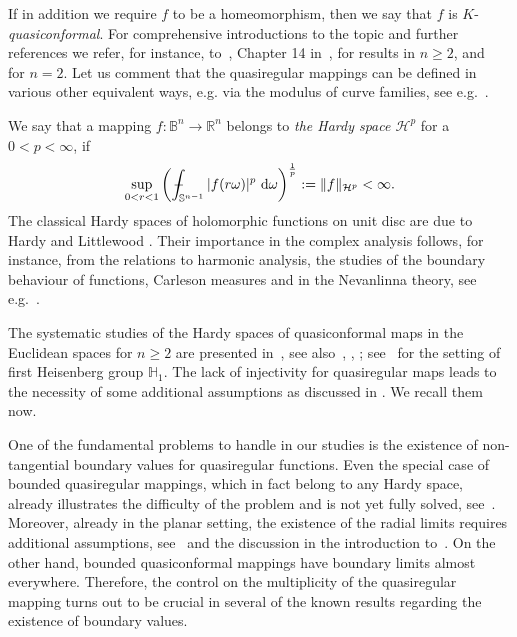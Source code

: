 \documentclass[11pt,a4paper,reqno]{amsart}
\theoremstyle{definition}
\def\vint{\mathop{\mathchoice%
          {\setbox0\hbox{$\displaystyle\intop$}\kern 0.22\wd0%
           \vcenter{\hrule width 0.6\wd0}\kern -0.82\wd0}%
          {\setbox0\hbox{$\textstyle\intop$}\kern 0.2\wd0%
           \vcenter{\hrule width 0.6\wd0}\kern -0.8\wd0}%
          {\setbox0\hbox{$\scriptstyle\intop$}\kern 0.2\wd0%
           \vcenter{\hrule width 0.6\wd0}\kern -0.8\wd0}%
          {\setbox0\hbox{$\scriptscriptstyle\intop$}\kern 0.2\wd0%
           \vcenter{\hrule width 0.6\wd0}\kern -0.8\wd0}}%
          \mathopen{}\int}
\newcommand{\om}{\omega}
\newcommand{\B}{\mathbb{B}^n}
\newcommand{\Rn}{{\mathbb R}^n}
\newcommand{\ud}{\mathrm {d}}
\newcommand{\Sn}{\mathbb{S}^{n-1}}
\numberwithin{komcounter}{section}
\begin{document}
 If in addition we require $f$ to be a homeomorphism, then we say that $f$ is $K$-\textit{quasi\-con\-formal}. For comprehensive introductions to the topic and further references we refer, for instance, to~\cite{Ric}, Chapter 14 in~\cite{hkm},\cite{resh} for results in $n\geq 2$, and~\cite{aim} for $n=2$. Let us comment that the quasiregular mappings can be defined in various other equivalent ways, e.g. via the modulus of curve families, see e.g.~\cite{va, vuo2}. 
\smallskip
 
 We say that a mapping $f:\B \to \Rn$ belongs to \emph{the Hardy space $\mathcal{H}^p$} for a $0<p<\infty $, if
\[
\sup_{0<r<1} \left(\vint_{\Sn} |f (r\om)|^p ~\ud\om\right)^{\frac1p} := \|f\|_{\mathcal{H}^p}< \infty.
\]
The classical Hardy spaces of holomorphic functions on unit disc are due to Hardy and Littlewood \cite{hl}. Their importance in the complex analysis follows, for instance, from the relations to harmonic analysis, the studies of the boundary behaviour of functions, Carleson measures and in the Nevanlinna theory, see e.g.~\cite{D, g}. 
 
The systematic studies of the Hardy spaces of quasiconformal maps in the Euclidean spaces for $n\geq 2$ are presented in~\cite{ak}, see also~\cite{bk, bkl}, \cite{z}, \cite{nol}; see~\cite{af} for the setting of first Heisenberg group $\mathbb{H}_1$. The lack of injectivity for quasiregular maps leads to the necessity of some additional assumptions as discussed in \cite{ag1, ag2}. We recall them now.
\smallskip

 One of the fundamental problems to handle in our studies is the existence of non-tangential boundary values for quasiregular functions. Even the special case of bounded quasi\-re\-gu\-lar mappings, which in fact belong to any Hardy space, already illustrates the difficulty of the problem and is not yet fully solved, see~\cite{ra08}. Moreover, already in the planar setting, the existence of the radial limits requires additional assumptions, see~\cite{ma, ag1} and the discussion in the introduction to~\cite{ag2}. On the other hand, bounded quasiconformal mappings have boundary limits almost everywhere. Therefore, the control on the multiplicity of the quasiregular mapping turns out to be crucial in several of the known results regarding the existence of boundary values.
\end{document}
